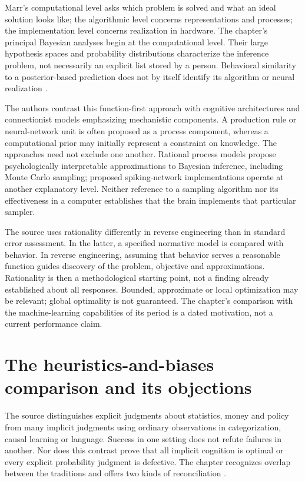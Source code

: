 Marr's computational level asks which problem is solved and what an ideal
solution looks like; the algorithmic level concerns representations and
processes; the implementation level concerns realization in hardware.
The chapter's principal Bayesian analyses begin at the computational level.
Their large hypothesis spaces and probability distributions characterize
the inference problem, not necessarily an explicit list stored by a person.
Behavioral similarity to a posterior-based prediction does not by itself
identify its algorithm or neural realization
\cite[pp.~23--25]{GriffithsTenenbaumKemp2012BayesianInference}.

The authors contrast this function-first approach with cognitive architectures
and connectionist models emphasizing mechanistic components. A production
rule or neural-network unit is often proposed as a process component,
whereas a computational prior may initially represent a constraint on
knowledge. The approaches need not exclude one another. Rational process
models propose psychologically interpretable approximations to Bayesian
inference, including Monte Carlo sampling; proposed spiking-network
implementations operate at another explanatory level. Neither reference
to a sampling algorithm nor its effectiveness in a computer establishes
that the brain implements that particular sampler.

The source uses rationality differently in reverse engineering than in
standard error assessment. In the latter, a specified normative model is
compared with behavior. In reverse engineering, assuming that behavior
serves a reasonable function guides discovery of the problem, objective
and approximations. Rationality is then a methodological starting point,
not a finding already established about all responses. Bounded, approximate
or local optimization may be relevant; global optimality is not guaranteed.
The chapter's comparison with the machine-learning capabilities of its
period is a dated motivation, not a current performance claim.

\section{The heuristics-and-biases comparison and its objections}
\label{sec:p19-bci-rivals}

The source distinguishes explicit judgments about statistics, money and
policy from many implicit judgments using ordinary observations in
categorization, causal learning or language. Success in one setting does
not refute failures in another. Nor does this contrast prove that all
implicit cognition is optimal or every explicit probability judgment is
defective. The chapter recognizes overlap between the traditions and
offers two kinds of reconciliation
\cite[pp.~25--27]{GriffithsTenenbaumKemp2012BayesianInference}.

